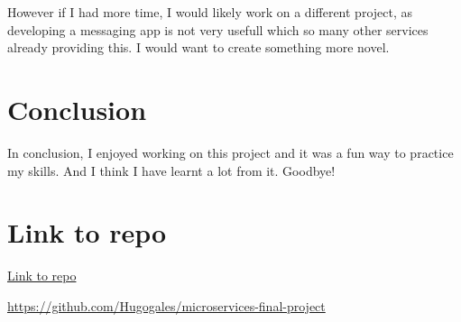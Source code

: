 \documentclass[12pt]{Article}
\begin{document}
However if I had more time, I would likely work on a different project, as developing a messaging app is not very usefull which so many other services already providing this.
I would want to create something more novel.

\section{Conclusion}
In conclusion, I enjoyed working on this project and it was a fun way to practice my skills.
And I think I have learnt a lot from it.
Goodbye!

\section{Link to repo}
\href{https://github.com/Hugogales/microservices-final-project}{Link to repo}



\href{https://github.com/Hugogales/microservices-final-project}{https://github.com/Hugogales/microservices-final-project}
\end{document}
